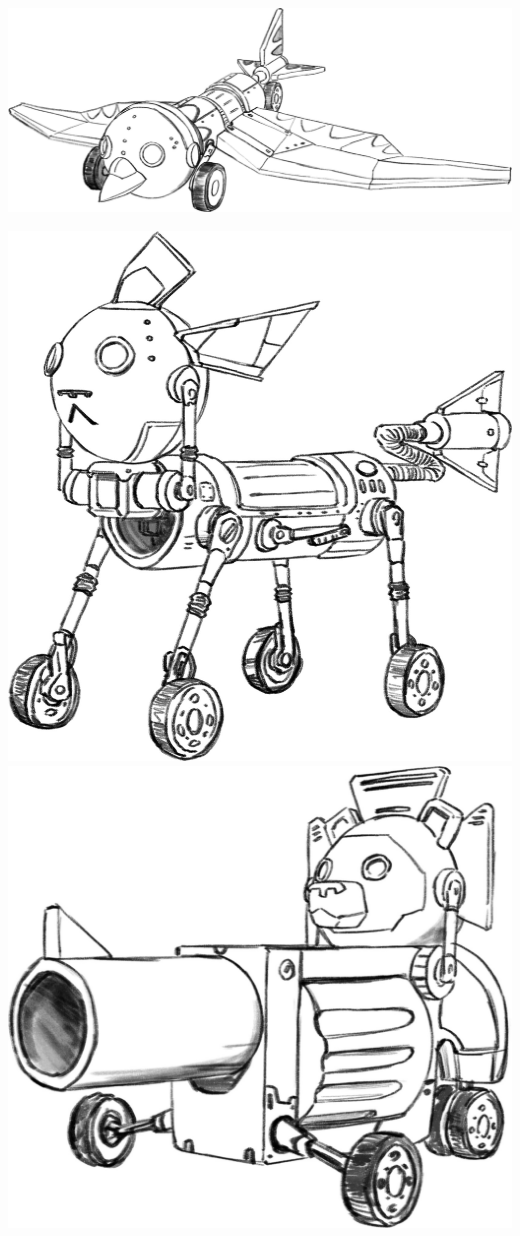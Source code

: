 \begin{center}
    \includegraphics[height=.15\textheight]{Assets/wfbw_pigeon}
\end{center}
\begin{center}
    \includegraphics[height=.2\textheight]{Assets/wfbw_liqueon}
    \includegraphics[height=.2\textheight]{Assets/wfbw_guneon}
\end{center}

